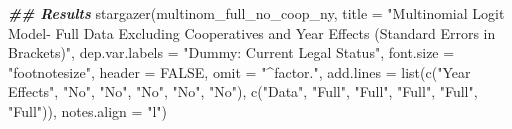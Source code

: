 \documentclass[a4paper,nobind]{templates/ociamthesis}
\newenvironment{Shaded}{\begin{snugshade}}{\end{snugshade}}
\newcommand{\AttributeTok}[1]{\textcolor[rgb]{0.77,0.63,0.00}{#1}}
\newcommand{\ConstantTok}[1]{\textcolor[rgb]{0.00,0.00,0.00}{#1}}
\newcommand{\DocumentationTok}[1]{\textcolor[rgb]{0.56,0.35,0.01}{\textbf{\textit{#1}}}}
\newcommand{\FunctionTok}[1]{\textcolor[rgb]{0.00,0.00,0.00}{#1}}
\newcommand{\NormalTok}[1]{#1}
\newcommand{\StringTok}[1]{\textcolor[rgb]{0.31,0.60,0.02}{#1}}
\renewenvironment{Shaded}
{
  \vspace{10pt}%
  \begin{snugshade}%
}{%
  \end{snugshade}%
  \vspace{8pt}%
}
\begin{document}
\begin{Shaded}
\begin{Highlighting}[]
\DocumentationTok{\#\# Results }
\FunctionTok{stargazer}\NormalTok{(multinom\_full\_no\_coop\_ny, }\AttributeTok{title =} \StringTok{"Multinomial Logit Model{-} Full Data Excluding Cooperatives and Year Effects (Standard Errors in Brackets)"}\NormalTok{, }\AttributeTok{dep.var.labels =} \StringTok{"Dummy: Current Legal Status"}\NormalTok{, }\AttributeTok{font.size =} \StringTok{"footnotesize"}\NormalTok{, }\AttributeTok{header =} \ConstantTok{FALSE}\NormalTok{, }\AttributeTok{omit =} \StringTok{"\^{}factor."}\NormalTok{, }\AttributeTok{add.lines =} \FunctionTok{list}\NormalTok{(}\FunctionTok{c}\NormalTok{(}\StringTok{"Year Effects"}\NormalTok{, }\StringTok{"No"}\NormalTok{, }\StringTok{"No"}\NormalTok{, }\StringTok{"No"}\NormalTok{, }\StringTok{"No"}\NormalTok{, }\StringTok{"No"}\NormalTok{), }\FunctionTok{c}\NormalTok{(}\StringTok{"Data"}\NormalTok{, }\StringTok{"Full"}\NormalTok{, }\StringTok{"Full"}\NormalTok{, }\StringTok{"Full"}\NormalTok{, }\StringTok{"Full"}\NormalTok{, }\StringTok{"Full"}\NormalTok{)), }\AttributeTok{notes.align =} \StringTok{"l"}\NormalTok{)}
\end{Highlighting}
\end{Shaded}
\end{document}
